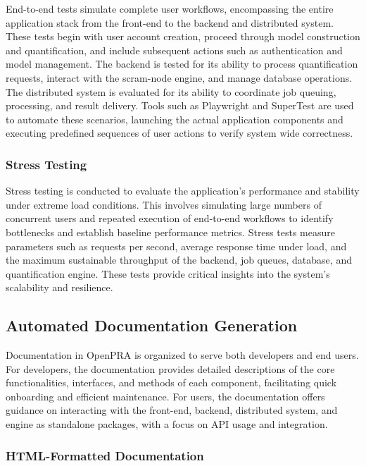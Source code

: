 End-to-end tests simulate complete user workflows, encompassing the entire application stack from the front-end to the backend and distributed system. These tests begin with user account creation, proceed through model construction and quantification, and include subsequent actions such as authentication and model management. The backend is tested for its ability to process quantification requests, interact with the scram-node engine, and manage database operations. The distributed system is evaluated for its ability to coordinate job queuing, processing, and result delivery. Tools such as Playwright and SuperTest are used to automate these scenarios, launching the actual application components and executing predefined sequences of user actions to verify system wide correctness.

\subsubsection{Stress Testing}

Stress testing is conducted to evaluate the application's performance and stability under extreme load conditions. This involves simulating large numbers of concurrent users and repeated execution of end-to-end workflows to identify bottlenecks and establish baseline performance metrics. Stress tests measure parameters such as requests per second, average response time under load, and the maximum sustainable throughput of the backend, job queues, database, and quantification engine. These tests provide critical insights into the system's scalability and resilience.



\subsection{Automated Documentation Generation}

Documentation in OpenPRA is organized to serve both developers and end users. For developers, the documentation provides detailed descriptions of the core functionalities, interfaces, and methods of each component, facilitating quick onboarding and efficient maintenance. For users, the documentation offers guidance on interacting with the front-end, backend, distributed system, and engine as standalone packages, with a focus on API usage and integration.

\subsubsection{HTML-Formatted Documentation}

